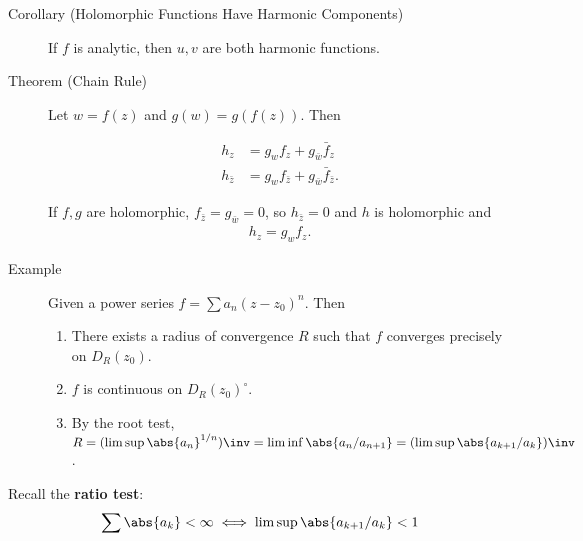 \begin{description}
\item[Corollary (Holomorphic Functions Have Harmonic Components)]
If \(f\) is analytic, then \(u, v\) are both harmonic functions.
\item[Theorem (Chain Rule)]
Let \(w = f(z)\) and \(g(w) = g(f(z))\). Then

\begin{align*}
h_z &= g_w f_z + g_{\bar w} \bar f_z \\
h_{\bar z} &= g_w f_{\bar z} + g_{\bar w} \bar f_{\bar z}
.\end{align*}

If \(f, g\) are holomorphic, \(f_{\bar z} = g_{\bar w} = 0\), so
\(h_{\bar z} = 0\) and \(h\) is holomorphic and
\begin{align*}h_z = g_w f_z.\end{align*}
\item[Example]
Given a power series \(f=\sum a_n (z- z_0)^n\). Then

\begin{enumerate}
\def\labelenumi{\arabic{enumi}.}
\tightlist
\item
  There exists a radius of convergence \(R\) such that \(f\) converges
  precisely on \(D_R(z_0)\).
\item
  \(f\) is continuous on \(D_R(z_0)^\circ\).
\item
  By the root test,
  \(R = (\limsup \abs{a_n}^{1/n})\inv = \liminf \abs{a_n/a_{n+1}} = (\limsup \abs{a_{k+1}/a_k})\inv\).
\end{enumerate}
\end{description}

Recall the \textbf{ratio test}:
\begin{align*}\sum \abs{a_k} <\infty \iff \limsup \abs{a_{k+1} / a_k} < 1\end{align*}

